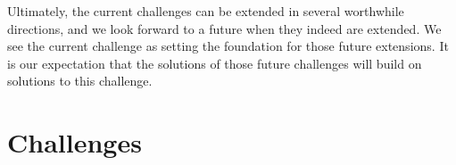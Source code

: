 \documentclass[runningheads]{llncs}
\begin{document}
Ultimately, the current challenges can be extended in several
worthwhile directions, and we look forward to a future when they
indeed are extended. We see the current challenge as setting
the foundation for those future extensions. It is our expectation that
the solutions of those future challenges will build on solutions
to this challenge.




\clearpage
\appendix
\section{Challenges}\label{app:challenges}

\end{document}
